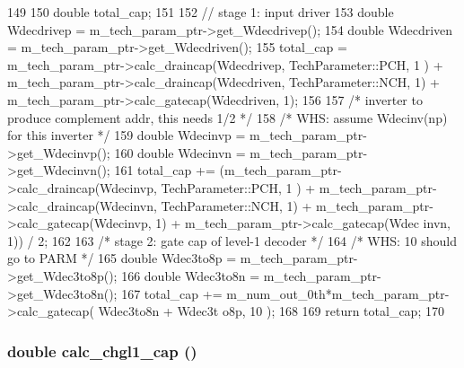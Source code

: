\begin{DoxyCode}
149 {
150     double total_cap;
151 
152     // stage 1: input driver
153     double Wdecdrivep = m_tech_param_ptr->get_Wdecdrivep();
154     double Wdecdriven = m_tech_param_ptr->get_Wdecdriven();
155     total_cap = m_tech_param_ptr->calc_draincap(Wdecdrivep, TechParameter::PCH, 1
      ) + m_tech_param_ptr->calc_draincap(Wdecdriven, TechParameter::NCH, 1) + 
      m_tech_param_ptr->calc_gatecap(Wdecdriven, 1);
156 
157     /* inverter to produce complement addr, this needs 1/2 */
158     /* WHS: assume Wdecinv(np) for this inverter */
159     double Wdecinvp = m_tech_param_ptr->get_Wdecinvp();
160     double Wdecinvn = m_tech_param_ptr->get_Wdecinvn();
161     total_cap += (m_tech_param_ptr->calc_draincap(Wdecinvp, TechParameter::PCH, 1
      ) + m_tech_param_ptr->calc_draincap(Wdecinvn, TechParameter::NCH, 1) + 
      m_tech_param_ptr->calc_gatecap(Wdecinvp, 1) + m_tech_param_ptr->calc_gatecap(Wdec
      invn, 1)) / 2;
162 
163     /* stage 2: gate cap of level-1 decoder */
164     /* WHS: 10 should go to PARM */
165     double Wdec3to8p = m_tech_param_ptr->get_Wdec3to8p();
166     double Wdec3to8n = m_tech_param_ptr->get_Wdec3to8n();
167     total_cap += m_num_out_0th*m_tech_param_ptr->calc_gatecap( Wdec3to8n + Wdec3t
      o8p, 10 );
168 
169     return total_cap;
170 }
\end{DoxyCode}
\hypertarget{classDecoderUnit_abcf1816aefe7bb7487cc90b9b3eff418}{
\subsubsection[{calc\_\-chgl1\_\-cap}]{\setlength{\rightskip}{0pt plus 5cm}double calc\_\-chgl1\_\-cap ()}}
\label{classDecoderUnit_abcf1816aefe7bb7487cc90b9b3eff418}



